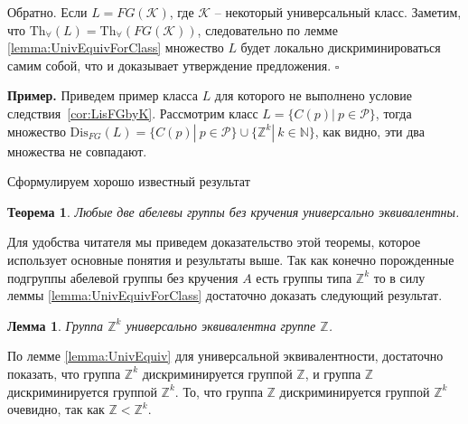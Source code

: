 \documentclass[a4paper,11pt,twoside]{article}
\newtheorem{theorem}{Теорема}[section]
\newtheorem{lemma}{Лемма}[section]
\def\proof{{\noindent{\bf Доказательство.}} }
\def\K{{\mathcal{K}}}
\def\P{{\mathcal{P}}}
\def\Z{{\mathbb{Z}}}
\def\N{{\mathbb{N}}}
\def\Tha{{\mathrm{Th}_\forall}}
\def\Dis{{\mathrm{Dis}}}
\begin{document}
Обратно. Если $L = FG(\K)$, где $\K$ -- некоторый универсальный класс. Заметим, что $\Tha(L) = \Tha(FG(\K))$, следовательно по лемме \ref{lemma:UnivEquivForClass} множество $L$ будет локально дискриминироваться самим собой, что и доказывает утверждение предложения. $\square$

\noindent \textbf{Пример.} Приведем пример класса $L$ для которого не выполнено условие следствия~\ref{cor:LisFGbyK}. Рассмотрим класс $L = \{C(p) | \ p \in \P\}$, тогда множество $\Dis_{FG}(L) = \{C(p) | \ p \in \P\} \cup \{\Z^k | \ k \in \N\}$, как видно, эти два множества не совпадают.







Сформулируем хорошо известный результат

\begin{theorem}\label{th:AbelUnivEquiv}
Любые две абелевы группы без кручения универсально эквивалентны.
\end{theorem}

Для удобства читателя мы приведем доказательство этой теоремы, которое использует основные понятия и результаты выше. Так как конечно порожденные подгруппы абелевой группы без кручения $A$ есть группы типа $\Z^k$ то в силу леммы \ref{lemma:UnivEquivForClass} достаточно доказать следующий результат.

\begin{lemma}\label{lemma:UnivEquivZk}
Группа $\Z^k$ универсально эквивалентна группе $\Z$.
\end{lemma}

\proof По лемме \ref{lemma:UnivEquiv} для универсальной эквивалентности, достаточно показать, что группа $\Z^k$ дискриминируется группой $\Z$, и группа $\Z$ дискриминируется группой $\Z^k$. То, что группа $\Z$ дискриминируется группой $\Z^k$ очевидно, так как $\Z < \Z^k$. 
\end{document}
